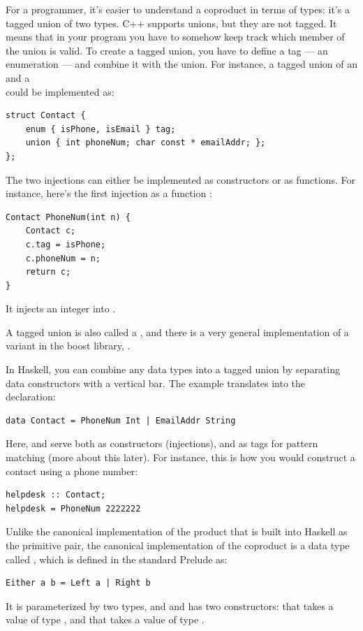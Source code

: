 For a programmer, it's easier to understand a coproduct in terms of
types: it's a tagged union of two types. C++ supports unions, but they
are not tagged. It means that in your program you have to somehow keep
track which member of the union is valid. To create a tagged union, you
have to define a tag --- an enumeration --- and combine it with the
union. For instance, a tagged union of an  and a\\
 could be implemented as:

\begin{verbatim}
struct Contact { 
    enum { isPhone, isEmail } tag;
    union { int phoneNum; char const * emailAddr; };
};
\end{verbatim}
The two injections can either be implemented as constructors or as
functions. For instance, here's the first injection as a function
:

\begin{verbatim}
Contact PhoneNum(int n) { 
    Contact c;
    c.tag = isPhone;
    c.phoneNum = n;
    return c;
}
\end{verbatim}
It injects an integer into .

A tagged union is also called a , and there is a very
general implementation of a variant in the boost library,
.

In Haskell, you can combine any data types into a tagged union by
separating data constructors with a vertical bar. The 
example translates into the declaration:

\begin{verbatim}
data Contact = PhoneNum Int | EmailAddr String
\end{verbatim}
Here,  and  serve both as
constructors (injections), and as tags for pattern matching (more about
this later). For instance, this is how you would construct a contact
using a phone number:

\begin{verbatim}
helpdesk :: Contact;
helpdesk = PhoneNum 2222222
\end{verbatim}
Unlike the canonical implementation of the product that is built into
Haskell as the primitive pair, the canonical implementation of the
coproduct is a data type called , which is defined in the
standard Prelude as:

\begin{verbatim}
Either a b = Left a | Right b
\end{verbatim}
It is parameterized by two types,  and  and has two
constructors:  that takes a value of type , and
 that takes a value of type .

